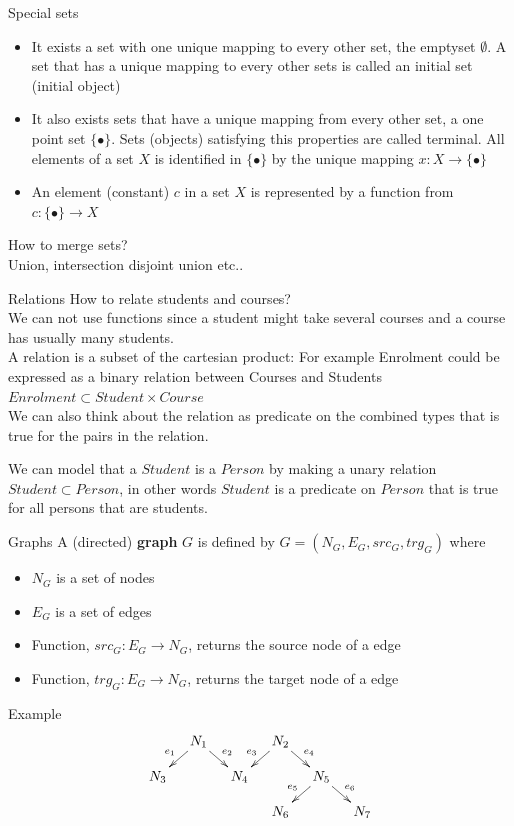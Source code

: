 \documentclass[slidetop,mathserif,red]{beamer}
\begin{document}
\begin{frame}{Special sets}
\begin{itemize}
\item It exists a set with one unique mapping to every other set, the emptyset $\emptyset$. A set that has a unique mapping to every other sets is called an initial set (initial object)

\item It also exists sets that have a unique mapping from every other set, a one point set $\{ \bullet \}$.
Sets (objects) satisfying this properties are called terminal.
All elements of a set $X$ is identified in $\{ \bullet \}$ by the unique mapping $x:X \to \{ \bullet \}$

\item An element (constant) $c$ in a set $X$ is represented by a function from $c: \{ \bullet \} \to X$
\end{itemize}


How to merge sets?\\
Union, intersection disjoint union etc..
\end{frame}



\begin{frame}{Relations}
How to relate students and courses?\\
 We can not use functions since a student might take several courses and a course has usually many students.\\
A relation is a subset of the cartesian product:
For example Enrolment could be expressed as a binary relation between Courses and Students
$Enrolment \subset Student \times Course$ \\
We can also think about the relation as predicate on the combined types that is true for the pairs in the relation.

We can model that a $Student$ is a $Person$ by making a unary relation $Student \subset Person$, in other words $Student$ is a predicate on $Person$ that is true for all persons that are students.
\end{frame}


\begin{frame}{Graphs}
A (directed) \textbf{graph} $G$ is defined by $G=(N_G,E_G,src_G,trg_G)$ where
  \begin{itemize}
  \item $N_G$ is a set of nodes
  \item $E_G$ is a set of edges
  \item Function, $src_G:E_G \to N_G$, returns the source node of a edge
  \item Function, $trg_G:E_G \to N_G$, returns the target node of a edge
  \end{itemize}
{Example}
     \[\xymatrixrowsep{0.15in}
		\xymatrixcolsep{0.15in}
      \xymatrix{		& N_1 \ar[dl]_{e_1} \ar[dr]	^{e_2}	&& N_2 \ar[dl]_{e_3} \ar[dr]^{e_4}\\
      					N_3		&&  N_4	& 						& N_5 \ar[dl]_{e_5} \ar[dr]^{e_6}\\
      																&&& N_6			&&  N_7} \]
\end{frame}
\end{document}
